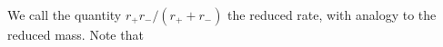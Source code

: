 We call the quantity \(r_+r_-/(r_++r_-)\) the reduced rate, with analogy to the reduced mass.  Note that 